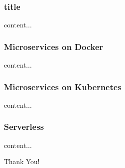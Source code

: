 \documentclass{beamer}
\begin{document}
\begin{frame}\frametitle{title}
content...
\end{frame}

\begin{frame}\frametitle{Microservices on Docker}
	content...
\end{frame}

\begin{frame}\frametitle{Microservices on Kubernetes}
content...
\end{frame}

\begin{frame}\frametitle{Serverless}
content...
\end{frame}




\begin{frame}
\Huge{\centerline{Thank You!}}
\end{frame}

\end{document}
